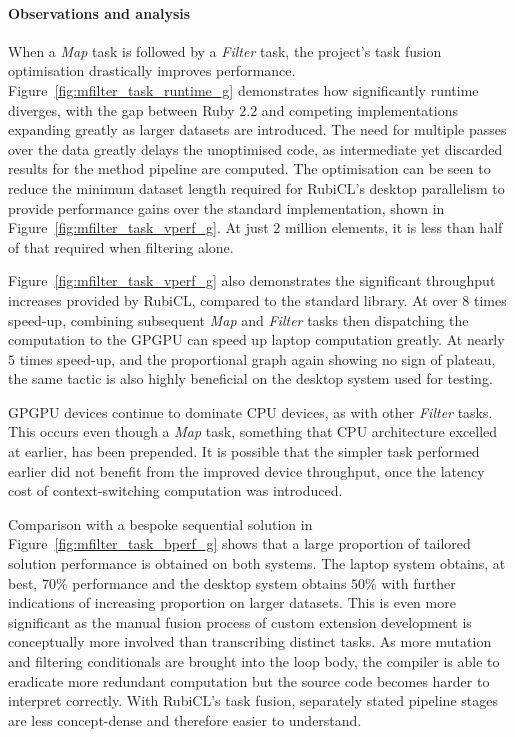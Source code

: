 \paragraph*{Observations and analysis}
When a \emph{Map} task is followed by a \emph{Filter} task, the project's task fusion optimisation drastically improves performance.
Figure~\ref{fig:mfilter_task_runtime_g} demonstrates how significantly runtime diverges, with the gap between Ruby $2.2$ and competing implementations expanding greatly as larger datasets are introduced.
The need for multiple passes over the data greatly delays the unoptimised code, as intermediate yet discarded results for the method pipeline are computed.
The optimisation can be seen to reduce the minimum dataset length required for RubiCL's desktop parallelism to provide performance gains over the standard implementation, shown in Figure~\ref{fig:mfilter_task_vperf_g}. At just $2$ million elements, it is less than half of that required when filtering alone.

Figure~\ref{fig:mfilter_task_vperf_g} also demonstrates the significant throughput increases provided by RubiCL, compared to the standard library. At over $8$ times speed-up, combining subsequent \emph{Map} and \emph{Filter} tasks then dispatching the computation to the \ac{GPGPU} can speed up laptop computation greatly. At nearly $5$ times speed-up, and the proportional graph again showing no sign of plateau, the same tactic is also highly beneficial on the desktop system used for testing.

\ac{GPGPU} devices continue to dominate \ac{CPU} devices, as with other \emph{Filter} tasks. This occurs even though a \emph{Map} task, something that \ac{CPU} architecture excelled at earlier, has been prepended. It is possible that the simpler task performed earlier did not benefit from the improved device throughput, once the latency cost of context-switching computation was introduced.

Comparison with a bespoke sequential solution in Figure~\ref{fig:mfilter_task_bperf_g} shows that a large proportion of tailored solution performance is obtained on both systems.
The laptop system obtains, at best, $70\%$ performance and the desktop system obtains $50\%$ with further indications of increasing proportion on larger datasets.
This is even more significant as the manual fusion process of custom extension development is conceptually more involved than transcribing distinct tasks.
As more mutation and filtering conditionals are brought into the loop body, the compiler is able to eradicate more redundant computation but the source code becomes harder to interpret correctly. With RubiCL's task fusion, separately stated pipeline stages are less concept-dense and therefore easier to understand.

